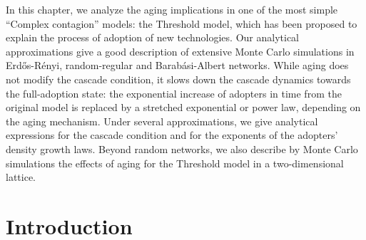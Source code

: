 In this chapter, we analyze the aging implications in one of the most simple ``Complex contagion'' models: the Threshold model, which has been proposed to  explain the process of adoption of new technologies. Our analytical approximations give a good description of extensive Monte Carlo simulations in Erd\H{o}s-R\'enyi, random-regular and Barab\'asi-Albert networks. While aging does not modify the cascade condition, it slows down the cascade dynamics towards the full-adoption state: the exponential increase of adopters in time from the original model is replaced by a stretched exponential or power law, depending on the aging mechanism. Under several approximations, we give analytical expressions for the cascade condition and for the exponents of the adopters' density growth laws. Beyond random networks, we also describe by Monte Carlo simulations the effects of aging for the Threshold model in a two-dimensional lattice.

\section{\label{sec:Introduction} Introduction}


